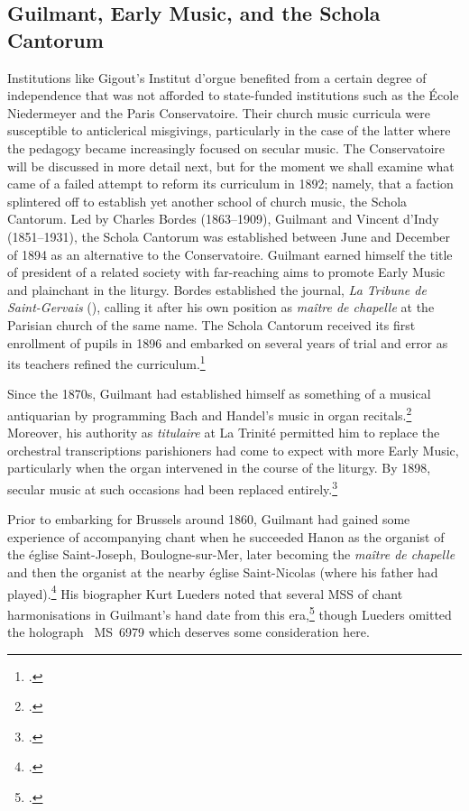\subsection{Guilmant, Early Music, and the Schola Cantorum} %
Institutions like Gigout's Institut d'orgue benefited from a certain degree of independence that was not afforded to state-funded institutions such as the École Niedermeyer and the Paris Conservatoire.
Their church music curricula were susceptible to anticlerical misgivings, particularly in the case of the latter where the pedagogy became increasingly focused on secular music.
The Conservatoire will be discussed in more detail next, but for the moment we shall examine what came of a failed attempt to reform its curriculum in 1892; namely, that a faction splintered off to establish yet another school of church music, the Schola Cantorum.
Led by Charles Bordes (1863--1909), Guilmant and Vincent d'Indy (1851--1931), the Schola Cantorum was established between June and December of 1894 as an alternative to the Conservatoire.
Guilmant earned himself the title of president of a related society with far-reaching aims to promote Early Music and plainchant in the liturgy.
Bordes established the journal, \emph{La Tribune de Saint-Gervais} (\tsg{}), calling it after his own position as \emph{maître de chapelle} at the Parisian church of the same name.
The Schola Cantorum received its first enrollment of pupils in 1896 and embarked on several years of trial and error as its teachers refined the curriculum.\footcite[221]{OchseOrganistsOrganPlaying2000}

Since the 1870s, Guilmant had established himself as something of a musical \mbox{antiquarian} by programming Bach and Handel's music in organ recitals.\footcite[5, 20, 80--82]{FlintScholaCantorumEarly2006}
Moreover, his authority as \emph{titulaire} at La Trinité permitted him to replace the orchestral transcriptions parishioners had come to expect with more Early Music, particularly when the organ intervened in the course of the liturgy.
By 1898, secular music at such occasions had been replaced entirely.\footcite[364]{LuedersAlexandreGuilmant18372002}

\label{ln:guilmant_style}%
Prior to embarking for Brussels around 1860, Guilmant had gained some experience of accompanying chant when he succeeded Hanon as the organist of the église Saint-Joseph, Boulogne-sur-Mer, later becoming the \emph{maître de chapelle} and then the organist at the nearby église Saint-Nicolas (where his father had played).\footcite[69]{OchseOrganistsOrganPlaying2000}
His biographer Kurt Lueders noted that several MSS of chant harmonisations in Guilmant's hand date from this era,\footcite[pp.~693--4 \S{}28]{LuedersAlexandreGuilmant18372002} though Lueders omitted the holograph \bnf{}~MS~6979 which deserves some consideration here.


